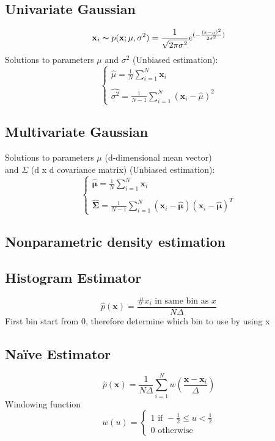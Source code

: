\subsection*{Univariate Gaussian}
\[\mathbf{x}_i \thicksim p(\mathbf{x};\mu, \sigma^2) = \frac{1}{\sqrt{2\pi \sigma^2}}e^{(-\frac{(x-\mu)^2}{2\sigma^2})}\]
Solutions to parameters $\mu$ and $\sigma^2$ (Unbiased estimation):\\
\[\begin{cases}
    \hat{\mu} = \frac{1}{N}\sum^N_{i=1}\mathbf{x}_i \\\\
    \hat{\sigma^2} = \frac{1}{N-1}\sum^N_{i=1}(\mathbf{x}_i - \hat{\mu})^2 
\end{cases}\]
\subsection*{Multivariate Gaussian}
Solutions to parameters $\mu$ (d-dimensional mean vector)\\
and $\Sigma$ (d x d covariance matrix) (Unbiased estimation):\\

\[\begin{cases}
    \hat{\mathbf{\mu}} = \frac{1}{N}\sum^N_{i=1}\mathbf{x}_i \\\\
    \hat{\mathbf{\Sigma}} = \frac{1}{N-1}\sum^N_{i=1}(\mathbf{x}_i - \hat{\mathbf{\mu}})(\mathbf{x}_i - \hat{\mathbf{\mu}})^T
\end{cases}\]

\subsection*{Nonparametric density estimation}
\subsection*{Histogram Estimator}
\[\hat{p}(\mathbf{x})=\frac{\# x_i \text{ in same bin as } x}{N\Delta}\]
First bin start from 0, therefore determine which bin to use by using x
\subsection*{Na\"ive Estimator}
\[\hat{p}(\mathbf{x})=\frac{1}{N\Delta}\sum^N_{i=1}w(\frac{\mathbf{x} - \mathbf{x}_i}{\Delta})\]
Windowing function
\[w(u) = \begin{cases}
    1 \text{ if } -\frac{1}{2} \leq u < \frac{1}{2}\\
    0 \text{ otherwise}
\end{cases}\]

